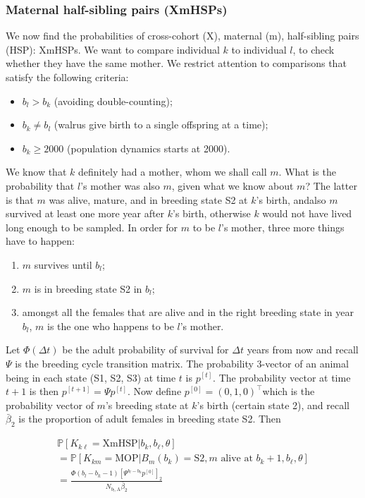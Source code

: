 \subsubsection{Maternal half-sibling pairs (XmHSPs)}

We now find the probabilities of cross-cohort (X), maternal (m), half-sibling
pairs (HSP): XmHSPs. We want to compare individual \emph{$k$} to
individual \emph{$l$}, to check whether they have the same mother.
We restrict attention to comparisons that satisfy the following criteria:
\begin{itemize}
\item $b_{l}>b_{k}$ (avoiding double-counting);
\item $b_{k}\neq b_{l}$ (walrus give birth to a single offspring at a time);
\item $b_{k}\geqslant2000$ (population dynamics starts at 2000).
\end{itemize}
We know that $k$ definitely had a mother, whom we shall call $m$.
What is the probability that $l$'s mother was also $m$, given what
we know about $m$? The latter is that \textit{\emph{ }}\emph{$m$}
was alive, mature, and in breeding state S2 at $k$'s birth, andalso
\emph{$m$} survived at least one more year after\emph{ }$k$'s birth,
otherwise \emph{$k$} would not have lived long enough to be sampled.
In order for \emph{$m$} to be $l$'s mother, three more things have
to happen:
\begin{enumerate}
\item $m$ survives until $b_{l}$;
\item $m$ is in breeding state S2 in $b_{l}$;
\item amongst all the females that are alive and in the right breeding state
in year $b_{l}$, $m$ is the one who happens to be $l$'s mother.
\end{enumerate}
Let $\Phi\left(\Delta t\right)$ be the adult probability of survival
for $\Delta t$ years from \textquotedbl now\textquotedbl{} and recall
$\Psi$ is the breeding cycle transition matrix. The probability 3-vector
of an animal being in each state (S1, S2, S3) at time $t$ is $p^{\left[t\right]}$.
The probability vector at time $t+1$ is then $p^{\left[t+1\right]}=\Psi p^{\left[t\right]}$.
Now define $p^{\left[0\right]}=\left(0,1,0\right)^{\top}$which is
the probability vector of \emph{$m$}'s breeding state at $k$'s birth
(certain state 2), and recall $\bar{\beta}_{2}$ is the proportion
of adult females in breeding state S2. Then

\begin{gather}
\mathbb{P}\left[K_{k\ell}=\text{XmHSP}|b_{k},b_{\ell},\theta\right]\nonumber \\
=\mathbb{P}\left[K_{km}=\text{MOP}|B_{m}\left(b_{k}\right)=\text{S2},m\text{ alive at }b_{k}+1,b_{\ell},\theta\right]\nonumber \\
=\frac{\Phi\left(b_{l}-b_{k}-1\right)\left[\Psi^{b_{l}-b_{k}}p^{\left[0\right]}\right]_{2}}{N_{b_{l},\text{A}}\bar{\beta}_{2}}\label{eq:xmhsp}
\end{gather}

